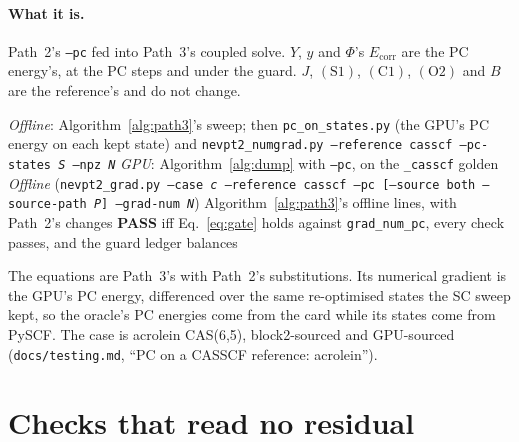 \documentclass[11pt]{article}
\newcommand{\code}[1]{\texttt{#1}}
\newcommand{\Ecorr}{E_{\mathrm{corr}}}
\newcommand{\cons}[1]{\ensuremath{(\mathrm{#1})}}
\begin{document}
\paragraph{What it is.} Path~2's \code{--pc} fed into Path~3's coupled solve.
$Y$, $y$ and $\Phi$'s $\Ecorr$ are the PC energy's, at the PC steps and under
the guard. $J$, \cons{S1}, \cons{C1}, \cons{O2} and $B$ are the reference's
and do not change.

\begin{algorithm}[htbp]
\caption{Path 4, PC on CASSCF orbitals}
\label{alg:path4}
\begin{algorithmic}[1]
\Statex \textit{Offline}: Algorithm~\ref{alg:path3}'s sweep; then \code{pc\_on\_states.py} (the GPU's PC energy on each kept state) and \code{nevpt2\_numgrad.py --reference casscf --pc-states \textit{S} --npz \textit{N}}
\Statex \textit{GPU}: Algorithm~\ref{alg:dump} with \code{--pc}, on the \code{\_casscf} golden
\Statex \textit{Offline} (\code{nevpt2\_grad.py --case \textit{c} --reference casscf --pc [--source both --source-path \textit{P}] --grad-num \textit{N}})
\State Algorithm~\ref{alg:path3}'s offline lines, with Path~2's changes
\State \textbf{PASS} iff Eq.~\eqref{eq:gate} holds against \code{grad\_num\_pc}, every check passes, and the guard ledger balances
\end{algorithmic}
\end{algorithm}

The equations are Path~3's with Path~2's substitutions. Its numerical gradient
is the GPU's PC energy, differenced over the same re-optimised states the SC
sweep kept, so the oracle's PC energies come from the card while its states
come from PySCF. The case is acrolein CAS(6,5), block2-sourced and
GPU-sourced (\code{docs/testing.md}, ``PC on a CASSCF reference: acrolein'').

\section{Checks that read no residual}
\label{sec:checks}
\end{document}
